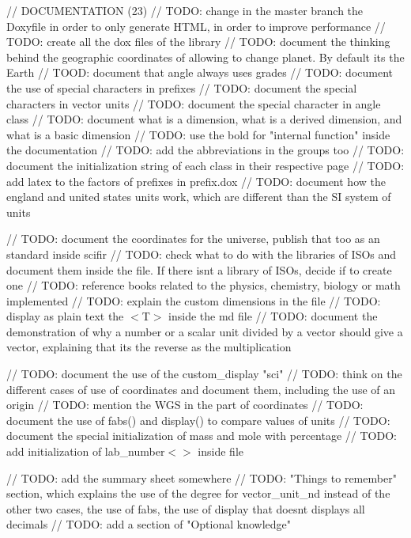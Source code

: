 // DOCUMENTATION (23) // TODO\+: change in the master branch the Doxyfile in order to only generate HTML, in order to improve performance // TODO\+: create all the dox files of the library // TODO\+: document the thinking behind the geographic coordinates of allowing to change planet. By default it\textquotesingle{}s the Earth // TOOD\+: document that angle always uses grades // TODO\+: document the use of special characters in prefixes // TODO\+: document the special characters in vector units // TODO\+: document the special character in angle class // TODO\+: document what is a dimension, what is a derived dimension, and what is a basic dimension // TODO\+: use the bold for "{}internal function"{} inside the documentation // TODO\+: add the abbreviations in the groups too // TODO\+: document the initialization string of each class in their respective page // TODO\+: add latex to the factors of prefixes in prefix.\+dox // TODO\+: document how the england and united states units work, which are different than the SI system of units

// TODO\+: document the coordinates for the universe, publish that too as an standard inside scifir // TODO\+: check what to do with the libraries of ISOs and document them inside the  file. If there isn\textquotesingle{}t a library of ISOs, decide if to create one // TODO\+: reference books related to the physics, chemistry, biology or math implemented // TODO\+: explain the custom dimensions in the file  // TODO\+: display as plain text the $<$\+T$>$ inside the md file // TODO\+: document the demonstration of why a number or a scalar unit divided by a vector should give a vector, explaining that it\textquotesingle{}s the reverse as the multiplication

// TODO\+: document the use of the custom\+\_\+display "{}sci"{} // TODO\+: think on the different cases of use of coordinates and document them, including the use of an origin // TODO\+: mention the WGS in the part of coordinates // TODO\+: document the use of fabs() and display() to compare values of units // TODO\+: document the special initialization of mass and mole with percentage // TODO\+: add initialization of lab\+\_\+number$<$$>$ inside  file

// TODO\+: add the summary sheet somewhere // TODO\+: "{}\+Things to remember"{} section, which explains the use of the degree for vector\+\_\+unit\+\_\+nd instead of the other two cases, the use of fabs, the use of display that doesn\textquotesingle{}t displays all decimals // TODO\+: add a section of "{}\+Optional knowledge"{}

